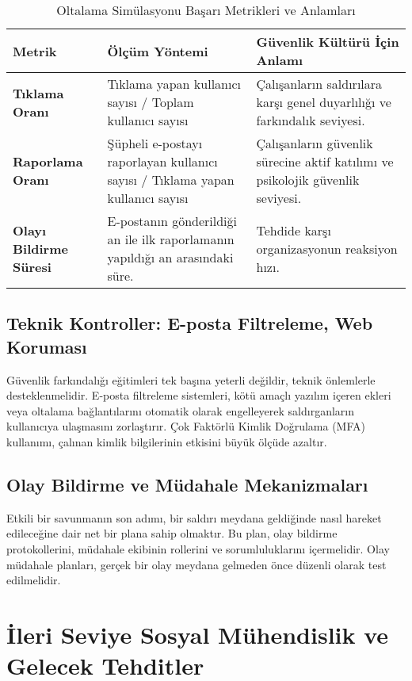 \begin{table}[htbp]
\centering
\caption{Oltalama Simülasyonu Başarı Metrikleri ve Anlamları}
\begin{tabularx}{\textwidth}{|p{4cm}|X|p{4cm}|}
\hline
\rowcolor{tableheadcolor}
\textbf{Metrik} & \textbf{Ölçüm Yöntemi} & \textbf{Güvenlik Kültürü İçin Anlamı}  \\
\hline
\textbf{Tıklama Oranı} & Tıklama yapan kullanıcı sayısı / Toplam kullanıcı sayısı & Çalışanların saldırılara karşı genel duyarlılığı ve farkındalık seviyesi.  \\
\hline
\textbf{Raporlama Oranı} & Şüpheli e-postayı raporlayan kullanıcı sayısı / Tıklama yapan kullanıcı sayısı & Çalışanların güvenlik sürecine aktif katılımı ve psikolojik güvenlik seviyesi.  \\
\hline
\textbf{Olayı Bildirme Süresi} & E-postanın gönderildiği an ile ilk raporlamanın yapıldığı an arasındaki süre. & Tehdide karşı organizasyonun reaksiyon hızı.  \\
\hline
\end{tabularx}
\end{table}

\subsection{Teknik Kontroller: E-posta Filtreleme, Web Koruması}

Güvenlik farkındalığı eğitimleri tek başına yeterli değildir, teknik önlemlerle desteklenmelidir. E-posta filtreleme sistemleri, kötü amaçlı yazılım içeren ekleri veya oltalama bağlantılarını otomatik olarak engelleyerek saldırganların kullanıcıya ulaşmasını zorlaştırır. Çok Faktörlü Kimlik Doğrulama (MFA) kullanımı, çalınan kimlik bilgilerinin etkisini büyük ölçüde azaltır.

\subsection{Olay Bildirme ve Müdahale Mekanizmaları}

Etkili bir savunmanın son adımı, bir saldırı meydana geldiğinde nasıl hareket edileceğine dair net bir plana sahip olmaktır. Bu plan, olay bildirme protokollerini, müdahale ekibinin rollerini ve sorumluluklarını içermelidir. Olay müdahale planları, gerçek bir olay meydana gelmeden önce düzenli olarak test edilmelidir.

\section{İleri Seviye Sosyal Mühendislik ve Gelecek Tehditler}

